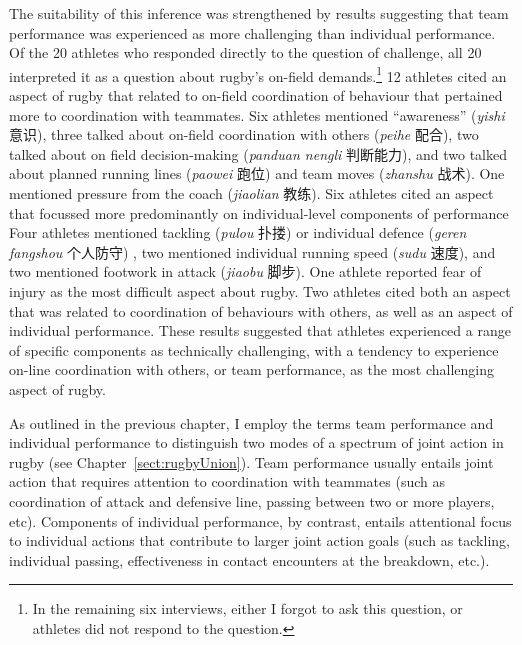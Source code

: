 \begin{CJK}{UTF8}{gbsn}
The suitability of this inference was strengthened by results suggesting that team performance was experienced as more challenging than individual performance.  Of the 20 athletes who responded directly to the question of challenge, all 20 interpreted it as a question about rugby's on-field demands.\footnote{In the remaining six interviews, either I forgot to ask this question, or athletes did not respond to the question.}  12 athletes cited an aspect of rugby that related to on-field coordination of behaviour that pertained more to coordination with teammates. Six athletes mentioned  ``awareness'' (\textit{yishi} 意识), three talked about on-field coordination with others (\textit{peihe} 配合), two talked about on field decision-making (\textit{panduan nengli} 判断能力), and two talked about planned running lines (\textit{paowei} 跑位) and team moves (\textit{zhanshu} 战术).  One mentioned pressure from the coach (\textit{jiaolian} 教练).
Six athletes cited an aspect that focussed more predominantly on individual-level  components of performance
Four athletes mentioned tackling (\textit{pulou} 扑搂) or individual defence (\textit{geren fangshou} 个人防守) , two mentioned individual running speed (\textit{sudu} 速度), and two mentioned footwork in attack (\textit{jiaobu} 脚步).  One athlete reported fear of injury as the most difficult aspect about rugby. Two athletes cited both an aspect that was related to coordination of behaviours with others, as well as an aspect of individual performance.  These results suggested that athletes experienced a range of specific components as technically challenging, with a tendency to experience on-line coordination with others, or team performance, as the most challenging aspect of rugby.

As outlined in the previous chapter, I employ the terms team performance and individual performance to distinguish two modes of a spectrum of joint action in rugby (see Chapter~\ref{sect:rugbyUnion}).
Team performance usually entails joint action that requires attention to coordination with teammates (such as coordination of attack and defensive line, passing between two or more players, etc).  Components of individual performance, by contrast, entails attentional focus to individual actions that contribute to larger joint action goals (such as tackling, individual passing, effectiveness in contact encounters at the breakdown, etc.).


\end{CJK}
